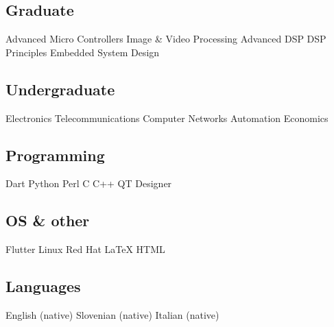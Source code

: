 \documentclass{dske-resume-openfont}
\begin{document}
\begin{minipage}[t]{0.31\textwidth}
\vspace{\leftSectionPadding}


{\fontsize{\the\leftColumnFont}{\the\leftColumnLineSpace}\selectfont
{\fontsize{\the\leftSubsectionSize}{\the\leftSubsectionLineSpace}\selectfont\subsection{Graduate}}
Advanced Micro Controllers \textbullet{} 
Image \& Video Processing \textbullet{}
Advanced DSP \textbullet{} 
DSP Principles \textbullet{} 
Embedded System Design
\vspace{\leftSmallGap}

{\fontsize{\the\leftSubsectionSize}{\the\leftSubsectionLineSpace}\selectfont\subsection{Undergraduate}}
Electronics \textbullet{} 
Telecommunications \textbullet{} 
Computer Networks \textbullet{} 
Automation \textbullet{}
Economics
}

\vspace{\leftSectionPadding}


{\fontsize{\the\leftColumnFont}{\the\leftColumnLineSpace}\selectfont
{\fontsize{\the\leftSubsectionSize}{\the\leftSubsectionLineSpace}\selectfont\subsection{Programming}}
Dart \textbullet{} Python \textbullet{} Perl \textbullet{} C \textbullet{} C++ \textbullet{} QT Designer
\vspace{\leftSmallGap}

{\fontsize{\the\leftSubsectionSize}{\the\leftSubsectionLineSpace}\selectfont\subsection{OS \& other}}
Flutter \textbullet{} Linux Red Hat \textbullet{} \LaTeX{} \textbullet{} HTML
\vspace{\leftSmallGap}

{\fontsize{\the\leftSubsectionSize}{\the\leftSubsectionLineSpace}\selectfont\subsection{Languages}}
English {\footnotesize(native)} \textbullet{} Slovenian {\footnotesize(native)} \textbullet{} Italian {\footnotesize(native)}
\vspace{\leftSmallGap}

}
\end{minipage}
\end{document}
